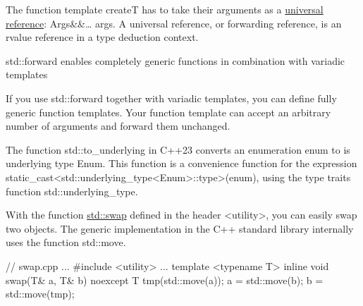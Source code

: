 The function template createT has to take their arguments as a \href{https://isocpp.org/blog/2012/11/universal-references-in-c11-scott-meyers}{universal reference}: Args\&\&… args. A universal reference, or forwarding reference, is an rvalue reference in a type deduction context.

\begin{myTip}{std::forward enables completely generic functions in combination with variadic templates}
	
If you use std::forward together with variadic templates, you can define fully generic function templates. Your function template can accept an arbitrary number of arguments and forward them unchanged.
	
\end{myTip}


The function std::to\_underlying in C++23 converts an enumeration enum to is underlying type Enum. This function is a convenience function for the expression static\_cast<std::underlying\_type<Enum>::type>(enum), using the type traits function std::underlying\_type.



With the function \href{http://en.cppreference.com/w/cpp/algorithm/swap}{std::swap} defined in the header <utility>, you can easily swap two objects. The generic implementation in the C++ standard library internally uses the function std::move.


\begin{cpp}
// swap.cpp
...
#include <utility>
...
template <typename T>
inline void swap(T& a, T& b) noexcept {
	T tmp(std::move(a));
	a = std::move(b);
	b = std::move(tmp);
}
\end{cpp}








































